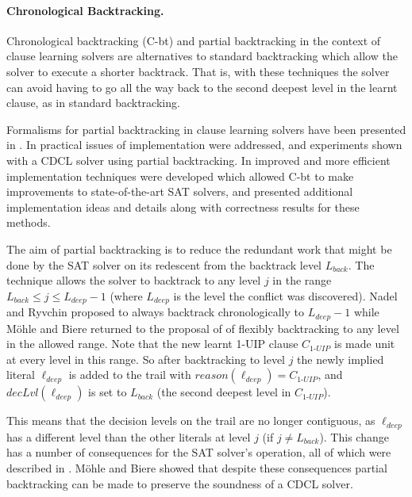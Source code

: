 \documentclass[runningheads]{llncs}
\newcommand{\sat}{SAT\xspace}
\newcommand{\dlevel}[1]{\ensuremath{\mathit{decLvl}(#1)}}
\newcommand{\reason}[1]{\ensuremath{\mathit{reason}(#1)}}
\newcommand{\uipcls}{C_{\textit{1-UIP}}}
\newcommand{\deepestLvl}{L_{\textit{deep}}}
\newcommand{\deepestLit}{\ell_{\textit{deep}}}
\newcommand{\btL}{L_{\textit{back}}}
\newcommand{\cbt}{C-bt\xspace}
\begin{document}
\paragraph{Chronological Backtracking.}
Chronological backtracking (\cbt) and partial backtracking in the
context of clause learning solvers are alternatives to standard
backtracking which allow the solver to execute a shorter
backtrack. That is, with these techniques the solver can avoid having
to go all the way back to the second deepest level in the learnt
clause, as in standard backtracking.

Formalisms for partial backtracking in clause learning solvers have
been presented in
\cite{DBLP:journals/jacm/NieuwenhuisOT06,nadelPhD}. In
\cite{DBLP:conf/lpar/JiangZ13} practical issues of implementation were
addressed, and experiments shown with a CDCL solver using partial
backtracking. In \cite{DBLP:conf/sat/NadelR18} improved and more
efficient implementation techniques were developed which allowed \cbt
to make improvements to state-of-the-art \sat solvers, and
\cite{DBLP:conf/sat/MohleB19} presented additional implementation
ideas and details along with correctness results for these methods.

The aim of partial backtracking is to reduce the redundant work that
might be done by the \sat solver on its redescent from the backtrack
level $\btL$. The technique allows the solver to backtrack to any
level $j$ in the range $\btL \leq j \leq \deepestLvl{-}1$ (where
$\deepestLvl$ is the level the conflict was discovered). Nadel and
Ryvchin \cite{DBLP:conf/sat/NadelR18} proposed to always backtrack
chronologically to $\deepestLvl{-}1$ while M{\"{o}}hle and Biere
\cite{DBLP:conf/sat/MohleB19} returned to the proposal of
\cite{DBLP:conf/lpar/JiangZ13} of flexibly backtracking to any level
in the allowed range. Note that the new learnt 1-UIP clause $\uipcls$
is made unit at every level in this range. So after backtracking to
level $j$ the newly implied literal $\deepestLit$ is added to the
trail with $\reason{\deepestLit}=\uipcls$, and $\dlevel{\deepestLit}$
is set to $\btL$ (the second deepest level in $\uipcls$).

This means that the decision levels on the trail are no longer
contiguous, as $\deepestLit$ has a different level than the other
literals at level $j$ (if $j\neq \btL$). This change has a number of
consequences for the \sat solver's operation, all of which were
described in \cite{DBLP:conf/lpar/JiangZ13}. M{\"{o}}hle and Biere
\cite{DBLP:conf/sat/MohleB19} showed that despite these consequences
partial backtracking can be made to preserve the soundness of a CDCL
solver.
\end{document}
